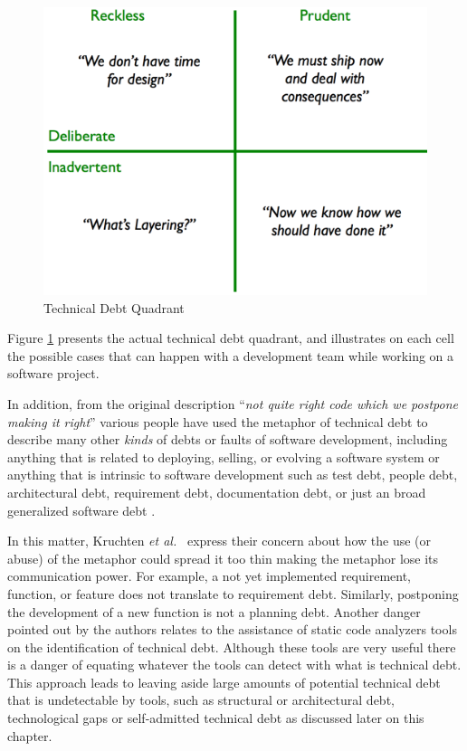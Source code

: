 \begin{figure}[thb!]
  \centering
  \vspace{5mm}
  \includegraphics[width=.65\textwidth]{figures/literature_review/technical_debt_quadrant.png}
  \caption{Technical Debt Quadrant}
  \label{fig:technical_debt_quadrant}
\end{figure}
  
Figure \ref{fig:technical_debt_quadrant} presents the actual technical debt quadrant, and illustrates on each cell the possible cases that can happen with a development team while working on a software project. 

In addition, from the original description ``\textit{not quite right code which we postpone making it right}'' various people have used the metaphor of technical debt to describe many other \emph{kinds} of debts or faults of software development, including anything that is related to deploying, selling, or evolving a software system or anything that is intrinsic to software development such as test debt, people debt, architectural debt, requirement debt, documentation debt, or just an broad generalized software debt \cite{sterling2010book}. 

In this matter, Kruchten \textit{et al.}~\cite{kruchten2012IEEE} express their concern about how the use (or abuse) of the metaphor could spread it too thin making the metaphor lose its communication power. For example, a not yet implemented requirement, function, or feature does not translate to  requirement debt. Similarly, postponing the development of a new function is not a planning debt. Another danger pointed out by the authors relates to the assistance of static code analyzers tools on the identification of technical debt. Although these tools are very useful there is a danger of equating whatever the tools can detect with what is technical debt. This approach leads to leaving aside large amounts of potential technical debt that is undetectable by tools, such as structural or architectural debt, technological gaps or self-admitted technical debt as discussed later on this chapter. 


